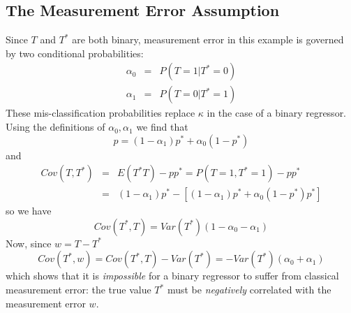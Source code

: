 \subsection{The Measurement Error Assumption}
Since $T$ and $T^*$ are both binary, measurement error in this example is governed by two conditional probabilities: 
\begin{eqnarray}
  \alpha_0 &=& P(T = 1 | T^* = 0)\\
  \alpha_1 &=& P(T = 0 | T^* = 1)
\end{eqnarray}
These mis-classification probabilities replace $\kappa$ in the case of a binary regressor.
Using the definitions of $\alpha_0,\alpha_1$ we find that
\begin{equation}
  p = \left( 1 - \alpha_{1} \right) p^* + \alpha_0 \left( 1 - p^* \right) 
\end{equation}
and
\begin{eqnarray*}
  Cov(T, T^*) &=& E(T^*T) - pp^* = P(T=1, T^*=1) - pp^* \\
  &=& \left( 1 - \alpha_1 \right) p^* -\left[ \left( 1 - \alpha_{1} \right) p^* + \alpha_0 \left( 1 - p^* \right)p^* \right]
\end{eqnarray*}
so we have
\begin{equation}
 Cov(T^*, T) = Var(T^*)(1-\alpha_0-\alpha_1) 
 \label{eq:CovTstarT}
\end{equation}
Now, since $w = T - T^*$
\begin{equation}
  Cov(T^*,w) = Cov(T^*,T) - Var(T^*) = -Var(T^*)(\alpha_0 + \alpha_1)
  \label{eq:CovTstarW}
\end{equation}
which shows that it is \emph{impossible} for a binary regressor to suffer from classical measurement error: the true value $T^*$ must be \emph{negatively} correlated with the measurement error $w$.


